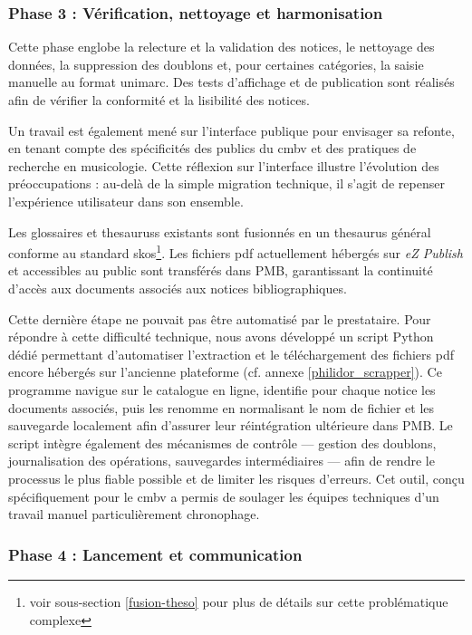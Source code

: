 \subsubsection{Phase 3 : Vérification, nettoyage et harmonisation}

Cette phase englobe la relecture et la validation des notices, le nettoyage des données, la suppression des doublons et, pour certaines catégories, la saisie manuelle au format \gls{unimarc}. Des tests d'affichage et de publication sont réalisés afin de vérifier la conformité et la lisibilité des notices.

Un travail est également mené sur l'interface publique pour envisager sa refonte, en tenant compte des spécificités des publics du \gls{cmbv} et des pratiques de recherche en musicologie. Cette réflexion sur l'interface illustre l'évolution des préoccupations : au-delà de la simple migration technique, il s'agit de repenser l'expérience utilisateur dans son ensemble.

Les glossaires et \glspl{thesaurus} existants sont fusionnés en un \gls{thesaurus} général conforme au standard \gls{skos}\footnote{voir sous-section \ref{fusion-theso} pour plus de détails sur cette problématique complexe}. Les fichiers \gls{pdf} actuellement hébergés sur \textit{eZ Publish} et accessibles au public sont transférés dans PMB, garantissant la continuité d'accès aux documents associés aux notices bibliographiques.

Cette dernière étape ne pouvait pas être automatisé par le prestataire. Pour répondre à cette difficulté technique, nous avons développé un script Python dédié permettant d’automatiser l’extraction et le téléchargement des fichiers \gls{pdf} encore hébergés sur l’ancienne plateforme (cf. annexe \ref{philidor_scrapper}). Ce programme navigue sur le catalogue en ligne, identifie pour chaque notice les documents associés, puis les renomme en normalisant le nom de fichier et les sauvegarde localement afin d’assurer leur réintégration ultérieure dans PMB. Le script intègre également des mécanismes de contrôle --- gestion des doublons, journalisation des opérations, sauvegardes intermédiaires --- afin de rendre le processus le plus fiable possible et de limiter les risques d’erreurs. Cet outil, conçu spécifiquement pour le \gls{cmbv} a permis de soulager les équipes techniques d’un travail manuel particulièrement chronophage.

\subsubsection{Phase 4 : Lancement et communication}

